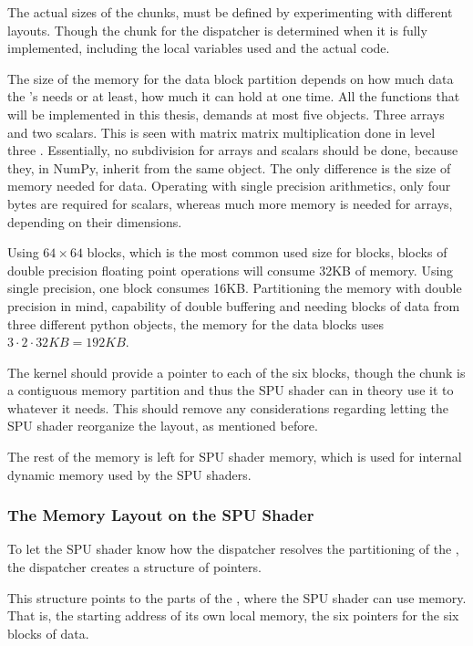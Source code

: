 The actual sizes of the chunks, must be defined by experimenting with
different layouts. Though the chunk for the dispatcher is determined
when it is fully implemented, including the local variables used and
the actual code.

The size of the memory for the data block partition depends on how
much data the \SPE{}'s needs or at least, how much it can hold at one
time. All the functions that will be implemented in this thesis,
demands at most five objects. Three arrays and two scalars. This is
seen with matrix matrix multiplication done in level three \BLAS{}.
Essentially, no subdivision for arrays and scalars should be done,
because they, in NumPy, inherit from the same object. The only
difference is the size of memory needed for data. Operating with
single precision arithmetics, only four bytes are required for
scalars, whereas much more memory is needed for arrays, depending on
their dimensions.

Using $64 \times 64$ blocks, which is the most common used size for
blocks, blocks of double precision floating point operations will
consume 32KB of memory. Using single precision, one block consumes
16KB. Partitioning the memory with double precision in mind,
capability of double buffering and needing blocks of data from three
different python objects, the memory for the data blocks uses $3 \cdot
2 \cdot 32KB = 192KB$.

The kernel should provide a pointer to each of the six blocks, though
the chunk is a contiguous memory partition and thus the SPU shader can
in theory use it to whatever it needs. This should remove any
considerations regarding letting the SPU shader reorganize the layout,
as mentioned before.

The rest of the memory is left for SPU shader memory, which is used
for internal dynamic memory used by the SPU shaders.

\subsubsection{The Memory Layout on the SPU Shader}

To let the SPU shader know how the dispatcher resolves the partitioning
of the \LS{}, the dispatcher creates a structure of pointers. 

This structure points to the parts of the \LS{}, where the SPU shader
can use memory. That is, the starting address of its own local memory,
the six pointers for the six blocks of data.

